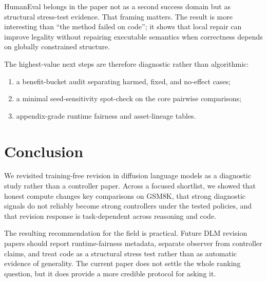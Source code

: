 \documentclass{article}
\begin{document}
HumanEval belongs in the paper not as a second success domain but as structural stress-test evidence. That framing matters. The result is more interesting than ``the method failed on code''; it shows that local repair can improve legality without repairing executable semantics when correctness depends on globally constrained structure.

The highest-value next steps are therefore diagnostic rather than algorithmic:
\begin{enumerate}
  \item a benefit-bucket audit separating harmed, fixed, and no-effect cases;
  \item a minimal seed-sensitivity spot-check on the core pairwise comparisons;
  \item appendix-grade runtime fairness and asset-lineage tables.
\end{enumerate}

\section{Conclusion}

We revisited training-free revision in diffusion language models as a diagnostic study rather than a controller paper. Across a focused shortlist, we showed that honest compute changes key comparisons on GSM8K, that strong diagnostic signals do not reliably become strong controllers under the tested policies, and that revision response is task-dependent across reasoning and code.

The resulting recommendation for the field is practical. Future DLM revision papers should report runtime-fairness metadata, separate observer from controller claims, and treat code as a structural stress test rather than as automatic evidence of generality. The current paper does not settle the whole ranking question, but it does provide a more credible protocol for asking it.



\end{document}
